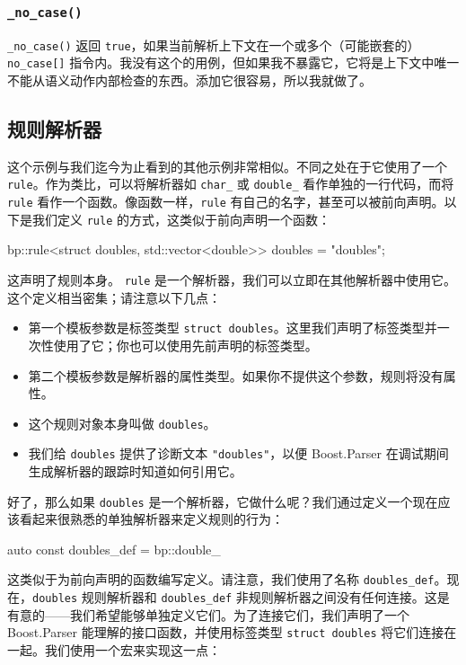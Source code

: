 \subsubsection{\texorpdfstring{\texttt{\_no\_case()}}{\_no\_case()}}

\texttt{\_no\_case()} 返回 \texttt{true}，如果当前解析上下文在一个或多个（可能嵌套的）\texttt{no\_case{[}{]}} 指令内。我没有这个的用例，但如果我不暴露它，它将是上下文中唯一不能从语义动作内部检查的东西。添加它很容易，所以我就做了。

\subsection{规则解析器}

这个示例与我们迄今为止看到的其他示例非常相似。不同之处在于它使用了一个 \texttt{rule}。作为类比，可以将解析器如 \texttt{char\_} 或 \texttt{double\_} 看作单独的一行代码，而将 \texttt{rule} 看作一个函数。像函数一样，\texttt{rule} 有自己的名字，甚至可以被前向声明。以下是我们定义 \texttt{rule} 的方式，这类似于前向声明一个函数：

\begin{code}
bp::rule<struct doubles, std::vector<double>> doubles = "doubles";
\end{code}

这声明了规则本身。 \texttt{rule} 是一个解析器，我们可以立即在其他解析器中使用它。这个定义相当密集；请注意以下几点：

\begin{itemize}
\item
  第一个模板参数是标签类型 \texttt{struct doubles}。这里我们声明了标签类型并一次性使用了它；你也可以使用先前声明的标签类型。
\item
  第二个模板参数是解析器的属性类型。如果你不提供这个参数，规则将没有属性。
\item
  这个规则对象本身叫做 \texttt{doubles}。
\item
  我们给 \texttt{doubles} 提供了诊断文本 \texttt{"doubles"}，以便 Boost.Parser 在调试期间生成解析器的跟踪时知道如何引用它。
\end{itemize}

好了，那么如果 \texttt{doubles} 是一个解析器，它做什么呢？我们通过定义一个现在应该看起来很熟悉的单独解析器来定义规则的行为：

\begin{code}
auto const doubles_def = bp::double_ %
\end{code}

这类似于为前向声明的函数编写定义。请注意，我们使用了名称 \texttt{doubles\_def}。现在，\texttt{doubles} 规则解析器和 \texttt{doubles\_def} 非规则解析器之间没有任何连接。这是有意的——我们希望能够单独定义它们。为了连接它们，我们声明了一个 Boost.Parser 能理解的接口函数，并使用标签类型 \texttt{struct doubles} 将它们连接在一起。我们使用一个宏来实现这一点：

